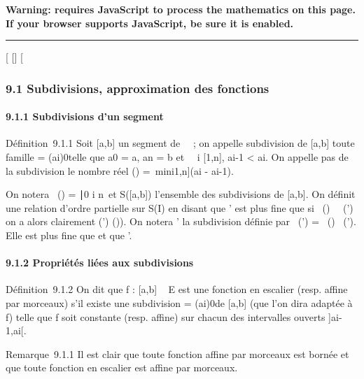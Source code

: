 \textbf{Warning: 
requires JavaScript to process the mathematics on this page.\\ If your
browser supports JavaScript, be sure it is enabled.}

\begin{center}\rule{3in}{0.4pt}\end{center}

{[}
{[}{]}
{[}

\subsubsection{9.1 Subdivisions, approximation des fonctions}

\paragraph{9.1.1 Subdivisions d'un segment}

Définition~9.1.1 Soit {[}a,b{]} un segment de ~~; on appelle subdivision
de {[}a,b{]} toute famille \sigma = (ai)0\leqi\leqn telle que
a0 = a, an = b et \forall~~i \in
{[}1,n{]}, ai-1 \textless{} ai. On appelle pas de la
subdivision \sigma le nombre réel \delta(\sigma) =\
mini\in{[}1,n{]}(ai - ai-1).

On notera \mathrmPt~(\sigma) =
\ai∣0 \leq i \leq
n\ et S({[}a,b{]}) l'ensemble des subdivisions de
{[}a,b{]}. On définit une relation d'ordre partielle sur S(I) en disant
que \sigma' est plus fine que \sigma si
\mathrmPt~(\sigma)
\subset~\mathrmPt~(\sigma') on a alors
clairement \delta(\sigma') \leq \delta(\sigma)). On notera \sigma \cup \sigma' la subdivision définie par
\mathrmPt~(\sigma \cup \sigma')
= \mathrmPt~(\sigma)
\cup\mathrmPt~(\sigma'). Elle est
plus fine que \sigma et que \sigma'.

\paragraph{9.1.2 Propriétés liées aux subdivisions}

Définition~9.1.2 On dit que f : {[}a,b{]} \rightarrow~ E est une fonction en
escalier (resp. affine par morceaux) s'il existe une subdivision \sigma =
(ai)0\leqi\leqn de {[}a,b{]} (que l'on dira adaptée à f)
telle que f soit constante (resp. affine) sur chacun des intervalles
ouverts {]}ai-1,ai{[}.

Remarque~9.1.1 Il est clair que toute fonction affine par morceaux est
bornée et que toute fonction en escalier est affine par morceaux.

